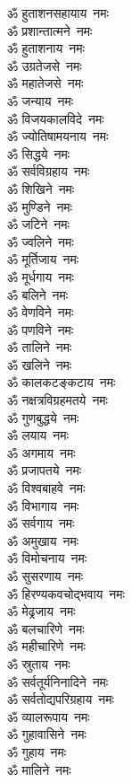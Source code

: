 \begin{multicols}{2}
\begin{flushleft}
ॐ हुताशनसहायाय~नमः\\
ॐ प्रशान्तात्मने~नमः\hfill{}\\
ॐ हुताशनाय~नमः\\
ॐ उग्रतेजसे~नमः\\
ॐ महातेजसे~नमः\\
ॐ जन्याय~नमः\\
ॐ विजयकालविदे~नमः\\
ॐ ज्योतिषामयनाय~नमः\\
ॐ सिद्धये~नमः\\
ॐ सर्वविग्रहाय~नमः\\
ॐ शिखिने~नमः\\
ॐ मुण्डिने~नमः\hfill{}\\
ॐ जटिने~नमः\\
ॐ ज्वलिने~नमः\\
ॐ मूर्तिजाय~नमः\\
ॐ मूर्धगाय~नमः\\
ॐ बलिने~नमः\\
ॐ वेणविने~नमः\\
ॐ पणविने~नमः\\
ॐ तालिने~नमः\\
ॐ खलिने~नमः\\
ॐ कालकटङ्कटाय~नमः\hfill{}\\
ॐ नक्षत्रविग्रहमतये~नमः\\
ॐ गुणबुद्धये~नमः\\
ॐ लयाय~नमः\\
ॐ अगमाय~नमः\\
ॐ प्रजापतये~नमः\\
ॐ विश्वबाहवे~नमः\\
ॐ विभागाय~नमः\\
ॐ सर्वगाय~नमः\\
ॐ अमुखाय~नमः\\
ॐ विमोचनाय~नमः\hfill{}\\
ॐ सुसरणाय~नमः\\
ॐ हिरण्यकवचोद्भवाय~नमः\\
ॐ मेढ्रजाय~नमः\\
ॐ बलचारिणे~नमः\\
ॐ महीचारिणे~नमः\\
ॐ स्रुताय~नमः\\
ॐ सर्वतूर्यनिनादिने~नमः\\
ॐ सर्वतोद्यपरिग्रहाय~नमः\\
ॐ व्यालरूपाय~नमः\\
ॐ गुहावासिने~नमः\hfill{}\\
ॐ गुहाय~नमः\\
ॐ मालिने~नमः\\

\end{flushleft}
\end{multicols}
